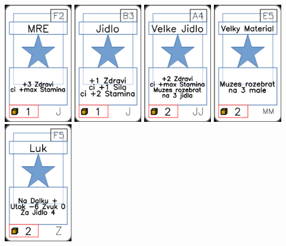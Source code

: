 \documentclass[a4paper]{article}
\begin{document}
	\includegraphics[width=3.0cm]{img-1_26}
	\includegraphics[width=3.0cm]{img-1_7}
	\includegraphics[width=3.0cm]{img-1_33}
	\includegraphics[width=3.0cm]{img-1_54}
	\includegraphics[width=3.0cm]{img-1_89}
\end{document}
